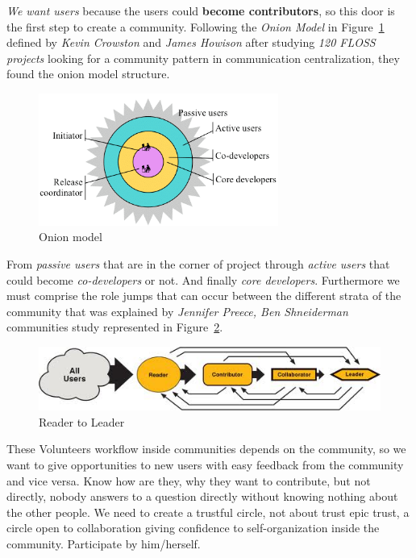 \documentclass[11pt]{scrartcl}
\begin{document}
\par \emph{We want users} because the users could \textbf{become contributors}, so this door is the first step to create a community. Following the \emph{Onion Model} in Figure~\ref{onion-model} defined by \emph{Kevin Crowston} and \emph{James Howison}\cite{social-structure-floss} after studying \emph{120 FLOSS projects} looking for a community pattern in communication centralization, they found the onion model structure.

\begin{figure}[H]
    \centering
    \includegraphics[width=0.7\textwidth]{onionstructure.png}
    \caption{Onion model}
    \label{onion-model}
\end{figure}

\par From \emph{passive users} that are in the corner of project through \emph{active users} that could become \emph{co-developers} or not. And finally \emph{core developers}. Furthermore we must comprise the role jumps that can occur between the different strata of the community that was explained by \emph{Jennifer Preece, Ben Shneiderman} communities study\cite{preece2009reader} represented in Figure~\ref{reader-to-leader}.

\begin{figure}[H]
    \centering
    \includegraphics[width=1\textwidth]{reader-to-leader.jpg}
    \caption{Reader to Leader}
    \label{reader-to-leader}
\end{figure}

\par These Volunteers workflow inside communities depends on the community, so we want to give opportunities to new users with easy feedback from the community and vice versa. Know how are they, why they want to contribute, but not directly, nobody answers to a question directly without knowing nothing about the other people. We need to create a trustful circle, not about trust epic trust, a circle open to collaboration giving confidence to self-organization inside the community. Participate by him/herself.
\end{document}
